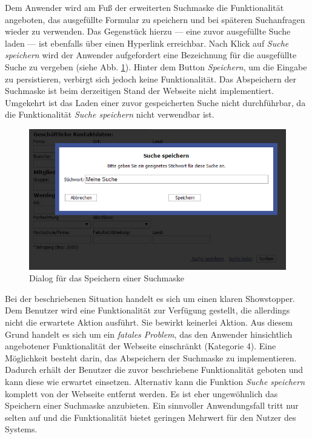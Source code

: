 {
	Dem Anwender wird am Fuß der erweiterten Suchmaske die Funktionalität angeboten, das ausgefüllte Formular zu speichern und bei späteren Suchanfragen wieder zu verwenden. Das Gegenstück hierzu --- eine zuvor ausgefüllte Suche laden --- ist ebenfalls über einen Hyperlink erreichbar. Nach Klick auf \emph{Suche speichern} wird der Anwender aufgefordert eine Bezeichnung für die ausgefüllte Suche zu vergeben (siehe Abb. \ref{fig:suche:speichern}). Hinter dem Button \emph{Speichern}, um die Eingabe zu persistieren, verbirgt sich jedoch keine Funktionalität. Das Abspeichern der Suchmaske ist beim derzeitigen Stand der Webseite nicht implementiert. Umgekehrt ist das Laden einer zuvor gespeicherten Suche nicht durchführbar, da die Funktionalität \emph{Suche speichern} nicht verwendbar ist.
	\begin{figure}[h]
		\centering
		\includegraphics[scale=0.75]{figures/suche_speichern.png}
		\caption{Dialog für das Speichern einer Suchmaske}
		\label{fig:suche:speichern}
	\end{figure}
}
{
	Bei der beschriebenen Situation handelt es sich um einen klaren \glqq Showstopper\grqq . Dem Benutzer wird eine Funktionalität zur Verfügung gestellt, die allerdings nicht die erwartete Aktion ausführt. Sie bewirkt keinerlei Aktion. Aus diesem Grund handelt es sich um ein \emph{fatales Problem}, das den Anwender hinsichtlich angebotener Funktionalität der Webseite einschränkt (Kategorie 4).
}
{
	Eine Möglichkeit besteht darin, das Abspeichern der Suchmaske zu implementieren. Dadurch erhält der Benutzer die zuvor beschriebene Funktionalität geboten und kann diese wie erwartet einsetzen. Alternativ kann die Funktion \emph{Suche speichern} komplett von der Webseite entfernt werden. Es ist eher ungewöhnlich das Speichern einer Suchmaske anzubieten. Ein sinnvoller Anwendungsfall tritt nur selten auf und die Funktionalität bietet geringen Mehrwert für den Nutzer des Systems.
}
\label{prob:suche:suchespeichern}

